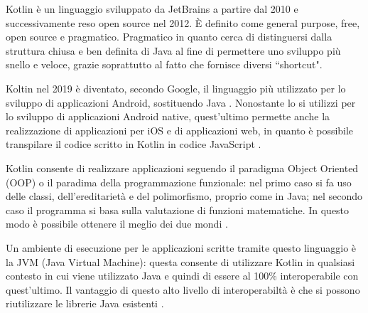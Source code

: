 Kotlin \`e un linguaggio sviluppato da JetBrains a partire dal 2010 e successivamente reso open source nel 2012. \`E definito come general purpose, free, open source e pragmatico. Pragmatico in quanto cerca di distinguersi dalla struttura chiusa e ben
definita di Java al fine di permettere uno sviluppo pi\`u snello e veloce, grazie soprattutto al fatto che fornisce diversi ``shortcut".

Koltin nel 2019 \`e diventato, secondo Google, il linguaggio pi\`u utilizzato per lo sviluppo di applicazioni Android, sostituendo Java \cite{KotlinTech}.
Nonostante lo si utilizzi per lo sviluppo di applicazioni Android native, quest'ultimo permette anche la realizzazione di applicazioni per iOS e di applicazioni web, in quanto \`e possibile transpilare il codice scritto in Kotlin
in codice JavaScript \cite{Kotlin:JetBrains}.

Kotlin consente di realizzare applicazioni seguendo il paradigma Object Oriented {}(OOP) o il paradima della programmazione funzionale: nel primo caso si fa uso delle classi, dell'ereditariet\`a e del polimorfismo, proprio come in Java;
nel secondo caso il programma si basa sulla valutazione di funzioni matematiche. In questo modo \`e possibile ottenere il meglio dei due mondi \cite{KotlinInfoWorld}.

Un ambiente di esecuzione per le applicazioni scritte tramite questo linguaggio \`e la JVM {}(Java Virtual Machine): questa consente di utilizzare Kotlin in
qualsiasi contesto in cui viene utilizzato Java e quindi di essere al 100\% interoperabile con quest'ultimo. Il vantaggio di questo alto livello di interoperabilt\`a \`e che si possono riutilizzare le librerie Java esistenti \cite{kotlin}.

